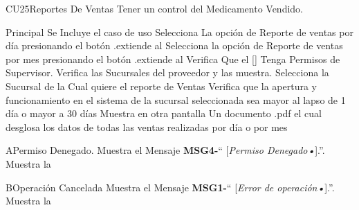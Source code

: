 \begin{UseCase}{CU25}{Reportes De Ventas}{
	Tener un control del Medicamento Vendido.
	}
	\end{UseCase}
	\begin{UCtrayectoria}{Principal}
		\UCpaso Se Incluye el caso de uso 
		\UCpaso[\UCactor] Selecciona La opción de Reporte de ventas por día presionando el botón .extiende al 
		\UCpaso [\UCactor] Selecciona la opción de Reporte de ventas por mes
		presionando el botón .extiende al 
		\UCpaso Verifica Que el [\UCactor] Tenga Permisos de Supervisor.
		\UCpaso Verifica las Sucursales del proveedor y las muestra.
		\UCpaso [\UCactor] Selecciona la Sucursal de la Cual quiere el reporte de Ventas
		\UCpaso Verifica que la apertura y funcionamiento en el sistema de la sucursal seleccionada sea mayor al lapso de 1 día  o mayor a 30 días 
		\UCpaso Muestra en otra pantalla Un documento .pdf el cual desglosa los datos de todas las ventas realizadas por día o por mes
	\end{UCtrayectoria}



\begin{UCtrayectoriaA}{A}{Permiso Denegado.}
			\UCpaso Muestra el Mensaje {\bf MSG4-}`` [{\em Permiso Denegado\textsl{•}}].''.
			\UCpaso Muestra la 
\end{UCtrayectoriaA}
\begin{UCtrayectoriaA}{B}{Operación Cancelada}
	\UCpaso Muestra el Mensaje {\bf MSG1-}`` [{\em Error de operación\textsl{•}}].''.
			\UCpaso Muestra la 
\end{UCtrayectoriaA}